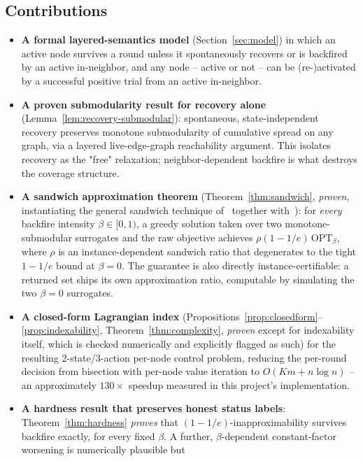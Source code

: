\documentclass[journal]{IEEEtran}
\begin{document}
\subsection*{Contributions}
\begin{itemize}
\item \textbf{A formal layered-semantics model} (Section~\ref{sec:model})
  in which an active node survives a round unless it spontaneously recovers
  or is backfired by an active in-neighbor, and any node -- active or not --
  can be (re-)activated by a successful positive trial from an active
  in-neighbor.
\item \textbf{A proven submodularity result for recovery alone}
  (Lemma~\ref{lem:recovery-submodular}): spontaneous, state-independent
  recovery preserves monotone submodularity of cumulative spread on any
  graph, via a layered live-edge-graph reachability argument. This isolates
  recovery as the "free" relaxation; neighbor-dependent backfire is what
  destroys the coverage structure.
\item \textbf{A sandwich approximation theorem} (Theorem~\ref{thm:sandwich},
  \emph{proven}, instantiating the general sandwich technique
  of~\cite{lu2015competition} together with~\cite{nemhauser1978analysis}):
  for \emph{every} backfire intensity $\beta \in [0,1)$, a greedy solution
  taken over two monotone-submodular surrogates and the raw objective
  achieves $\rho(1-1/e)\,\mathrm{OPT}_\beta$, where $\rho$ is an
  instance-dependent sandwich ratio that degenerates to the tight $1-1/e$
  bound at $\beta=0$. The guarantee is also directly instance-certifiable:
  a returned set ships its own approximation ratio, computable by simulating
  the two $\beta=0$ surrogates.
\item \textbf{A closed-form Lagrangian index} (Propositions~\ref{prop:closedform}--\ref{prop:indexability},
  Theorem~\ref{thm:complexity}, \emph{proven} except for indexability itself,
  which is checked numerically and explicitly flagged as such) for the
  resulting 2-state/3-action per-node control problem, reducing the
  per-round decision from bisection with per-node value iteration to
  $O(Km+n\log n)$ -- an approximately $130\times$ speedup measured in this
  project's implementation.
\item \textbf{A hardness result that preserves honest status labels}:
  Theorem~\ref{thm:hardness} \emph{proves} that $(1-1/e)$-inapproximability
  survives backfire exactly, for every fixed $\beta$. A further,
  $\beta$-dependent constant-factor worsening is numerically plausible but

\end{itemize}
\end{document}
